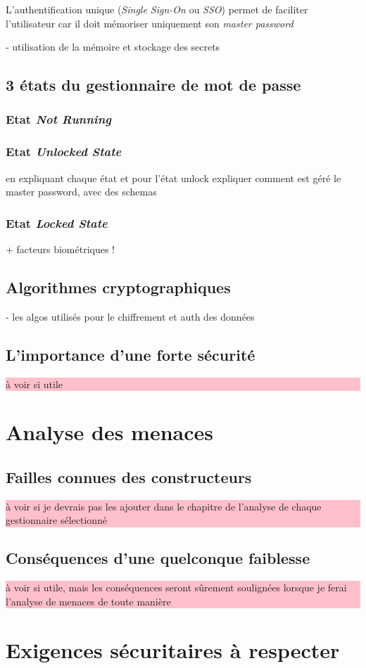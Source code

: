 L'authentification unique (\textit{Single Sign-On} ou \textit{SSO}) permet de faciliter l'utilisateur car il doit mémoriser uniquement son \textit{master password} 

- utilisation de la mémoire et stockage des secrets
\subsection{3 états du gestionnaire de mot de passe}

\subsubsection{Etat \textit{Not Running}}
\subsubsection{Etat \textit{Unlocked State}}
en expliquant chaque état et pour l'état unlock expliquer comment est géré le master password, avec des schemas
\subsubsection{Etat \textit{Locked State}}

+ facteurs biométriques !
\subsection{Algorithmes cryptographiques}
- les algos utilisés pour le chiffrement et auth des données 
\subsection{L'importance d'une forte sécurité}
\colorbox{pink}{\parbox{15cm}{à voir si utile}}
\section{Analyse des menaces}
\subsection{Failles connues des constructeurs}
\colorbox{pink}{\parbox{15cm}{à voir si je devrais pas les ajouter dans le chapitre de l'analyse de chaque gestionnaire sélectionné}}
\subsection{Conséquences d'une quelconque faiblesse}
\colorbox{pink}{\parbox{15cm}{à voir si utile, mais les conséquences seront sûrement soulignées lorsque je ferai l'analyse de menaces de toute manière}}
\section{Exigences sécuritaires à respecter}